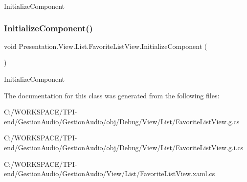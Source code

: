 Initialize\+Component 

\mbox{\label{class_presentation_1_1_view_1_1_list_1_1_favorite_list_view_a63a1effe9695d3d0757c0b7144603ab5}} 
\subsubsection{\texorpdfstring{Initialize\+Component()}{InitializeComponent()}\hspace{0.1cm}{\footnotesize\ttfamily [4/4]}}
{\footnotesize\ttfamily void Presentation.\+View.\+List.\+Favorite\+List\+View.\+Initialize\+Component (\begin{DoxyParamCaption}{ }\end{DoxyParamCaption})}



Initialize\+Component 



The documentation for this class was generated from the following files\+:\begin{DoxyCompactItemize}
\item 
C\+:/\+W\+O\+R\+K\+S\+P\+A\+C\+E/\+T\+P\+I-\/end/\+Gestion\+Audio/\+Gestion\+Audio/obj/\+Debug/\+View/\+List/Favorite\+List\+View.\+g.\+cs\item 
C\+:/\+W\+O\+R\+K\+S\+P\+A\+C\+E/\+T\+P\+I-\/end/\+Gestion\+Audio/\+Gestion\+Audio/obj/\+Debug/\+View/\+List/Favorite\+List\+View.\+g.\+i.\+cs\item 
C\+:/\+W\+O\+R\+K\+S\+P\+A\+C\+E/\+T\+P\+I-\/end/\+Gestion\+Audio/\+Gestion\+Audio/\+View/\+List/Favorite\+List\+View.\+xaml.\+cs\end{DoxyCompactItemize}
